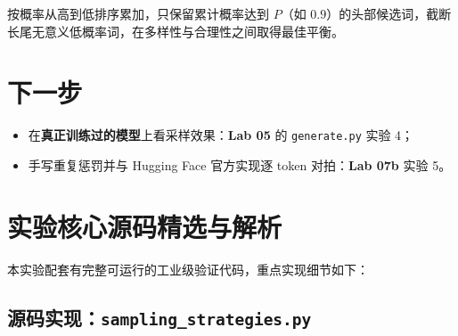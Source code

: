   按概率从高到低排序累加，只保留累计概率达到 $P$（如 $0.9$）的头部候选词，截断长尾无意义低概率词，在多样性与合理性之间取得最佳平衡。

\section{下一步}

\begin{itemize}
  \item 在\textbf{真正训练过的模型}上看采样效果：\textbf{Lab 05} 的 \texttt{generate.py} 实验 4；
  \item 手写重复惩罚并与 Hugging Face 官方实现逐 token 对拍：\textbf{Lab 07b} 实验 5。
\end{itemize}



\section{实验核心源码精选与解析}

本实验配套有完整可运行的工业级验证代码，重点实现细节如下：


\subsection{源码实现：\texttt{sampling\_strategies.py}}



